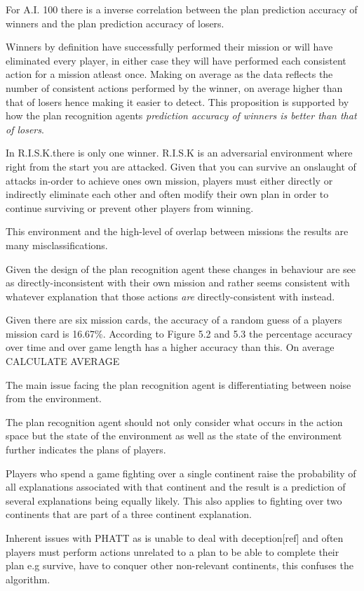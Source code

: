 \documentclass[parskip]{cs4rep}
\begin{document}
For A.I. 100 there is a inverse correlation between the plan prediction accuracy of winners and the plan prediction accuracy of losers.

Winners by definition have successfully performed their mission or will have eliminated every player, in either case they will have performed each consistent action for a mission atleast once. Making on average as the data reflects the number of consistent actions performed by the winner, on average higher than that of losers hence making it easier to detect. This proposition is supported by how the plan recognition agents \textit{prediction accuracy of winners is better than that of losers}.

In R.I.S.K.there is only one winner. R.I.S.K is an adversarial environment where right from the start you are attacked. Given that you can survive an onslaught of attacks in-order to achieve ones own mission, players must either directly or indirectly eliminate each other and often modify their own plan in order to continue surviving or prevent other players from winning. 

This environment and the high-level of overlap between missions the results are many misclassifications.

Given the design of the plan recognition agent these changes in behaviour are see as directly-inconsistent with their own mission and rather seems consistent with whatever explanation that those actions \textit{are} directly-consistent with instead.

Given there are six mission cards, the accuracy of a random guess of a players mission card is 16.67\%. According to Figure 5.2 and 5.3 the percentage accuracy over time and over game length has a higher accuracy than this. On average CALCULATE AVERAGE

The main issue facing the plan recognition agent is differentiating between noise from the environment.

The plan recognition agent should not only consider what occurs in the action space but the state of the environment as well as the state of the environment further indicates the plans of players.

Players who spend a game fighting over a single continent raise the probability of all explanations associated with that continent and the result is a prediction of several explanations being equally likely. This also applies to fighting over two continents that are part of a three continent explanation.

Inherent issues with PHATT as is unable to deal with deception[ref] and often players must perform actions unrelated to a plan to be able to complete their plan e.g survive, have to conquer other non-relevant continents, this confuses the algorithm.
\end{document}
